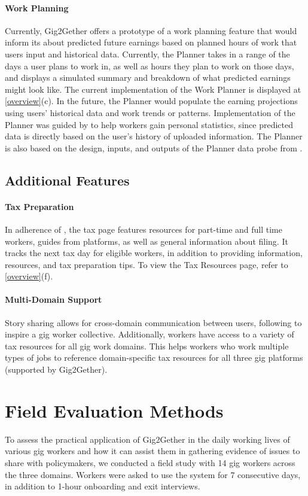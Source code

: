 \paragraph{Work Planning} Currently, Gig2Gether offers a prototype of a work planning feature that would inform its about predicted future earnings based on planned hours of work that users input and historical data. Currently, the Planner takes in a range of the days a user plans to work in, as well as hours they plan to work on those days, and displays a simulated summary and breakdown of what predicted earnings might look like. The current implementation of the Work Planner is displayed at \ref{overview}(c).
In the future, the Planner would populate the earning projections using users' historical data and work trends or patterns. 
Implementation of the Planner was guided by  to help workers gain personal statistics, since predicted data is directly based on the user's history of uploaded information. The Planner is also based on the design, inputs, and outputs of the Planner data probe from \cite{zhang2023stakeholder}.

\subsection{Additional Features}

\paragraph{Tax Preparation} In adherence of ,
the tax page features resources for part-time and full time workers, guides from platforms, as well as general information about filing. It tracks the next tax day for eligible workers, in addition to providing information, resources, and tax preparation tips. To view the Tax Resources page, refer to \ref{overview}(f).

\paragraph{Multi-Domain Support}
Story sharing allows for cross-domain communication between users, following  to inspire a gig worker collective. Additionally, workers have access to a variety of tax resources for all gig work domains. This helps workers who work multiple types of jobs to reference domain-specific tax resources for all three gig platforms (supported by Gig2Gether).

\section{Field Evaluation Methods}\label{field}
To assess the practical application of Gig2Gether in the daily working lives of various gig workers and how it can assist them in gathering evidence of issues to share with policymakers, we conducted a field study with 14 gig workers across the three domains. Workers were asked to use the system for 7 consecutive days, in addition to 1-hour onboarding and exit interviews.


